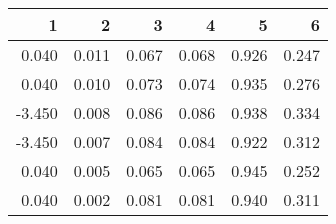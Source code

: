 \begin{table}[ht]
\centering
\begin{tabular}{rrrrrr}
  \hline
1 & 2 & 3 & 4 & 5 & 6 \\ 
  \hline
0.040 & 0.011 & 0.067 & 0.068 & 0.926 & 0.247 \\ 
  0.040 & 0.010 & 0.073 & 0.074 & 0.935 & 0.276 \\ 
  -3.450 & 0.008 & 0.086 & 0.086 & 0.938 & 0.334 \\ 
  -3.450 & 0.007 & 0.084 & 0.084 & 0.922 & 0.312 \\ 
  0.040 & 0.005 & 0.065 & 0.065 & 0.945 & 0.252 \\ 
  0.040 & 0.002 & 0.081 & 0.081 & 0.940 & 0.311 \\ 
   \hline
\end{tabular}
\end{table}
